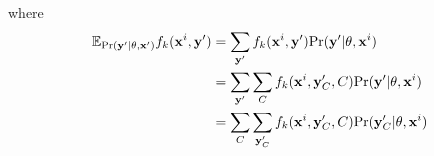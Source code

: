 where 
\begin{equation}
\begin{split}
	\mathbb{E}_{\text{Pr}(\mathbf y'| \theta, \mathbf x')} f_k(\mathbf x^i, \mathbf y') &= \sum_{\mathbf y'}  f_k(\mathbf x^i, \mathbf y')\text{Pr}(\mathbf y'|\theta, \mathbf x^i) \\
	&= \sum_{\mathbf y'} \sum_C f_k(\mathbf x^i, \mathbf y'_C, C)\text{Pr}(\mathbf y'|\theta, \mathbf x^i) \\
	&= \sum_C \sum_{\mathbf y_C'} f_k (\mathbf x^i, \mathbf y_C', C)\text{Pr}(\mathbf y_C'|\theta, \mathbf x^i)
\end{split}
\end{equation}